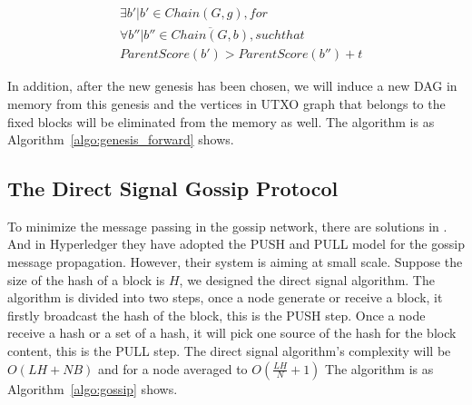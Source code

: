 \begin{equation}
    \begin{flalign*}
        & \exists b' | b' \in Chain(G, g), for \\ 
        & \forall b'' | b'' \in \overline{Chain(G,b)}, such that \\
        & ParentScore(b') > ParentScore(b'') + t 
    \end{flalign*}
\end{equation}

In addition, after the new genesis has been chosen, 
we will induce a new DAG in memory from this genesis 
and the vertices in UTXO graph that belongs to the fixed blocks will be eliminated from the memory as well.  
The algorithm is as Algorithm~\ref{algo:genesis_forward} shows.




\subsection{The Direct Signal Gossip Protocol}
To minimize the message passing in the gossip network,
there are solutions in \cite{demers1988epidemic}. And in Hyperledger \cite{androulaki2018hyperledger}
they have adopted the PUSH and PULL model for the gossip message propagation. However, their system is aiming at small scale.
Suppose the size of the hash of a block is $H$, we designed the direct signal algorithm.
The algorithm is divided into two steps, once a node generate or receive a block,
it firstly broadcast the hash of the block, this is the PUSH step.
Once a node receive a hash or a set of a hash,
it will pick one source of the hash for the block content, this is the PULL step.
The direct signal algorithm's complexity will be $O(LH + NB)$ and for a node averaged to $O(\frac{LH}{N} + 1)$
The algorithm is as Algorithm~\ref{algo:gossip} shows.



